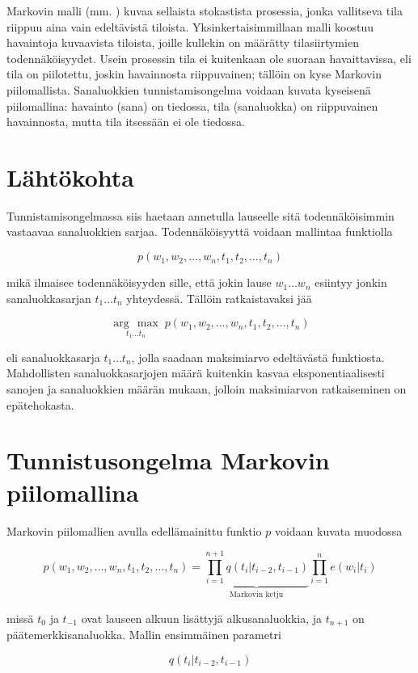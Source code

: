 \documentclass[utf8,bachelor,manualbib]{gradu3}
\newcommand{\argmax}[1]{\underset{#1}{\operatorname{arg}\,\operatorname{max}}\;}
\begin{document}
Markovin malli (mm. \citealp{rabiner1989}) kuvaa sellaista stokastista prosessia, jonka vallitseva tila riippuu aina vain edeltävistä tiloista. Yksinkertaisimmillaan malli koostuu havaintoja kuvaavista tiloista, joille kullekin on määrätty tilasiirtymien todennäköisyydet. Usein prosessin tila ei kuitenkaan ole suoraan havaittavissa, eli tila on piilotettu, joskin havainnosta riippuvainen; tällöin on kyse Markovin piilomallista. Sanaluokkien tunnistamisongelma voidaan kuvata kyseisenä piilomallina: havainto (sana) on tiedossa, tila (sanaluokka) on riippuvainen havainnosta, mutta tila itsessään ei ole tiedossa.


\section{Lähtökohta}

Tunnistamisongelmassa siis haetaan annetulla lauseelle sitä todennäköisimmin vastaavaa sanaluokkien sarjaa. Todennäköisyyttä voidaan mallintaa funktiolla

\[
p(w_1, w_2, \ldots, w_n, t_1, t_2, \ldots, t_n)
\]

mikä ilmaisee todennäköisyyden sille, että jokin lause $ w_1 \ldots w_n $ esiintyy jonkin sanaluokkasarjan $ t_1 \ldots t_n $ yhteydessä. Tällöin ratkaistavaksi jää

\[
\argmax{t_1 \ldots t_n} p(w_1, w_2, \ldots, w_n, t_1, t_2, \ldots, t_n)
\]

eli sanaluokkasarja $ t_1 \ldots t_n $, jolla saadaan maksimiarvo edeltävästä funktiosta. Mahdollisten sanaluokkasarjojen määrä kuitenkin kasvaa eksponentiaalisesti sanojen ja sanaluokkien määrän mukaan, jolloin maksimiarvon ratkaiseminen on epätehokasta.


\section{Tunnistusongelma Markovin piilomallina}

Markovin piilomallien avulla edellämainittu funktio $ p $ voidaan kuvata muodossa

\[
p(w_1, w_2, \ldots, w_n, t_1, t_2, \ldots, t_n) = \underbrace{\prod_{i=1}^{n+1} q(t_i | t_{i-2}, t_{i-1})}_\text{Markovin ketju}\prod_{i=1}^{n}e(w_i | t_i)
\]

missä $t_0$ ja $t_{-1}$ ovat lauseen alkuun lisättyjä alkusanaluokkia, ja $t_{n+1}$ on päätemerkkisanaluokka. Mallin ensimmäinen parametri

\[
q(t_i | t_{i-2}, t_{i-1})
\]
\end{document}
